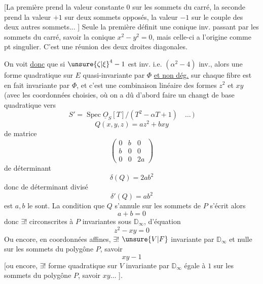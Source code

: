  [La première prend la valeur constante $0$ sur les sommets du carré, la seconde prend la valeur $+1$ sur  deux sommets opposés, la valeur $-1$ sur le couple des deux autres sommets... ] Seule la première définit une conique inv. passant par les sommets du carré, savoir la
conique $x^2-y^2=0$, mais celle-ci a l'origine comme pt singulier. C'est une réunion des deux droites diagonales.

On voit \uline{donc} que si ${\unsure{\zeta|\xi}}^{4}-1$ est inv. i.e. $(\alpha^2-4)$ inv., alors  une forme quadratique sur $E$ quasi-invariante par $\Phi$ \uline{et non dég.} sur chaque fibre est en fait invariante par $\Phi$, et c'est une combinaison linéaire des formes $z^2$ et $xy$ (avec les coordonnées choisies\unsure{\}|)},  où on a dû d'abord faire un changt de base quadratique vers
\[
S'=\operatorname{Spec}\underline O_S[T]/(T^2-\alpha T+1)\quad\ldots\,)
\]
\[
Q(x,y,z)=az^2+bxy\tag*{(5)}
\]
de  matrice
\[
\begin{pmatrix}0&b&0\\b&0&0\\0&0&2a\end{pmatrix}
\]
de déterminant
\[
\delta(Q)=2ab^2\tag*{(6)}
\]
donc de déterminant divisé
\[
\delta'(Q)=ab^2\tag*{(7)}
\]
 est   $a,b$ le sont. La condition que $Q$ s'annule sur les sommets de $P$ s'écrit alors
\[
a+b=0\tag*{(8)}
\]
donc  $\exists!$   circonscrites à $P$ invariantes sous $\mathbb D_\infty$,  d'équation
\[
z^2-xy=0\tag*{(9)}
\]
Ou encore, en coordonnées affines, $\exists!$
  $\unsure{V|F}$ invariante par $\mathbb D_\infty$ et nulle sur les sommets du polygône $P$, savoir
\[
xy-1
\]
[ou encore, $\exists!$ forme quadratique sur $V$ invariante par $\mathbb D_\infty$ égale à $1$ sur les sommets du polygône $P$, savoir $xy\ldots$ ].

